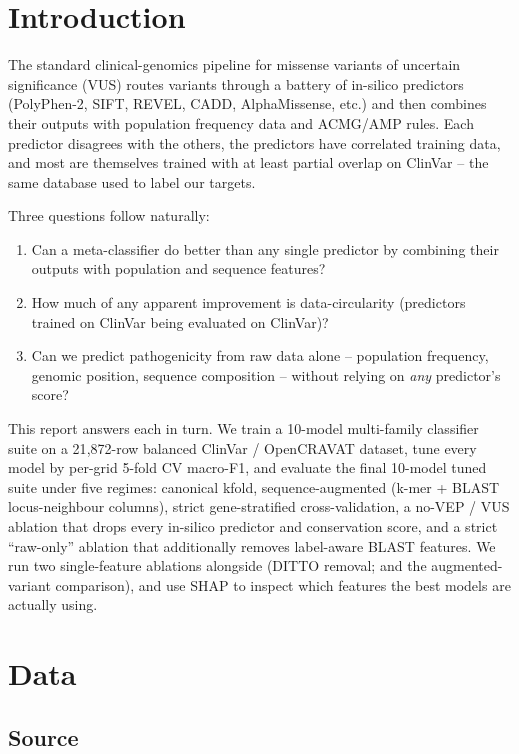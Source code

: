 \documentclass[11pt,a4paper]{article}
\begin{document}
\section{Introduction}

The standard clinical-genomics pipeline for missense variants of uncertain significance
(VUS) routes variants through a battery of in-silico predictors (PolyPhen-2, SIFT,
REVEL, CADD, AlphaMissense, etc.) and then combines their outputs with population
frequency data and ACMG/AMP rules. Each predictor disagrees with the others, the
predictors have correlated training data, and most are themselves trained with at
least partial overlap on ClinVar -- the same database used to label our targets.

Three questions follow naturally:
\begin{enumerate}[leftmargin=*]
 \item Can a meta-classifier do better than any single predictor by combining their
 outputs with population and sequence features?
 \item How much of any apparent improvement is data-circularity (predictors trained
 on ClinVar being evaluated on ClinVar)?
 \item Can we predict pathogenicity from raw data alone -- population frequency,
 genomic position, sequence composition -- without relying on \emph{any}
 predictor's score?
\end{enumerate}

This report answers each in turn. We train a 10-model multi-family classifier
suite on a 21{,}872-row balanced ClinVar / OpenCRAVAT
dataset, tune every model by per-grid 5-fold CV macro-F1, and evaluate the
final 10-model tuned suite under five regimes:
canonical kfold, sequence-augmented (k-mer + BLAST locus-neighbour columns),
strict gene-stratified cross-validation, a no-VEP /
VUS ablation that drops every in-silico predictor and conservation score, and a strict ``raw-only'' ablation that additionally
removes label-aware BLAST features. We run two
single-feature ablations alongside (DITTO removal; and the
augmented-variant comparison), and use SHAP to inspect which features the best models are
actually using.

\section{Data}

\subsection{Source}
\end{document}
